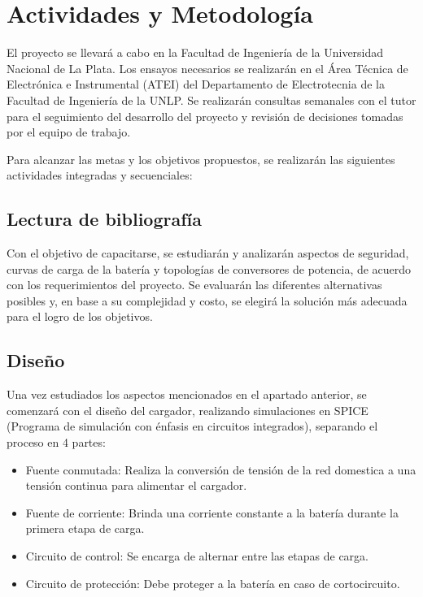 \section{Actividades y Metodología}


El proyecto se llevará a cabo en la Facultad de Ingeniería de la Universidad Nacional de La Plata.
Los ensayos necesarios se realizarán en el Área Técnica de Electrónica e Instrumental (ATEI)
del Departamento de Electrotecnia de la Facultad de Ingeniería de la UNLP.
Se realizarán consultas semanales con el tutor para el seguimiento del desarrollo del proyecto y
revisión de decisiones tomadas por el equipo de trabajo.

Para alcanzar las metas y los objetivos propuestos, se realizarán las siguientes actividades integradas y secuenciales:

\subsection{Lectura de bibliografía}
Con el objetivo de capacitarse, se estudiarán y analizarán aspectos de seguridad, curvas de carga de la batería 
y topologías de conversores de potencia, de acuerdo con los requerimientos del proyecto. 
Se evaluarán las diferentes alternativas posibles y,
en base a su complejidad y costo,
se elegirá la solución más adecuada para el logro de los objetivos. 

\subsection{Diseño}
Una vez estudiados los aspectos mencionados en el apartado anterior,
se comenzará con el diseño del cargador,
realizando simulaciones en SPICE (Programa de simulación con énfasis en circuitos integrados),
separando el proceso en 4 partes:
\begin{itemize}
    \item Fuente conmutada: Realiza la conversión de tensión de la red domestica a una tensión continua para alimentar el cargador.
    \item Fuente de corriente: Brinda una corriente constante a la batería durante la primera etapa de carga.
    \item Circuito de control: Se encarga de alternar entre las etapas de carga.
    \item Circuito de protección: Debe proteger a la batería en caso de cortocircuito.
\end{itemize}

